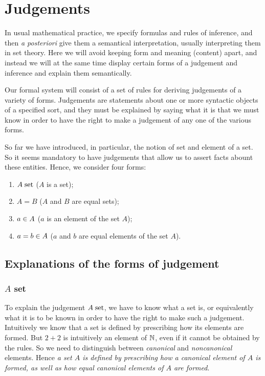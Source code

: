 \section{Judgements}

In usual mathematical practice, we specify formulas and rules of inference, and
then \emph{a posteriori} give them a semantical interpretation, usually
interpreting them in set theory. Here we will avoid keeping form and meaning
(content) apart, and instead we will at the same time display certain forms of a
judgement and inference and explain them semantically.

Our formal system will consist of a set of rules for deriving judgements of a
variety of forms. Judgements are statements about one or more syntactic objects
of a specified sort, and they must be explained by saying what it is that we
must know in order to have the right to make a judgement of any one of the
various forms.

So far we have introduced, in particular, the notion of set and element of a
set. So it seems mandatory to have judgements that allow us to assert facts
abount these entities. Hence, we consider four forms:

\begin{enumerate}
\item $A \; \text{set}$ ($A$ is a set);
\item $A = B$ ($A$ and $B$ are equal sets);
\item $a \in A$ ($a$ is an element of the set $A$);
\item $a = b \in A$ ($a$ and $b$ are equal elements of the set $A$).
\end{enumerate}

\subsection{Explanations of the forms of judgement}

\subsubsection{$A$ set}

To explain the judgement $A \; \text{set}$, we have to know what a set is, or
equivalently what it is to be known in order to have the right to make such a
judgement. Intuitively we know that a set is defined by prescribing how its
elements are formed. But $2 + 2$ is intuitively an element of $\mathbb{N}$, even if it
cannot be obtained by the rules. So we need to distinguish between
\emph{canonical} and \emph{noncanonical} elements. Hence \emph{a set $A$ is
  defined by prescribing how a canonical element of $A$ is formed, as well as
  how equal canonical elements of $A$ are formed}.

